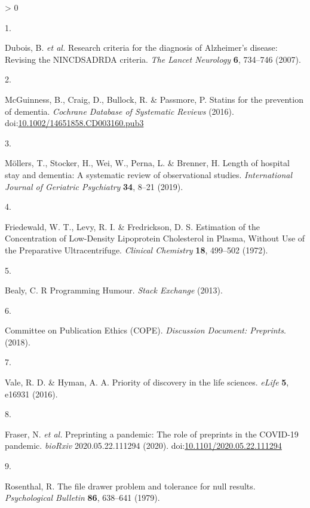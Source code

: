 \documentclass[a4paper, twoside]{templates/ociamthesis}
\newlength{\cslhangindent}
\newlength{\csllabelwidth}
\newenvironment{CSLReferences}[3] %
 {%
  \setlength{\parindent}{0pt}
  \ifodd #1 \everypar{\setlength{\hangindent}{\cslhangindent}}\ignorespaces\fi
  \ifnum #2 > 0
  \setlength{\parskip}{#2\baselineskip}
  \fi
 }%
 {}
\newcommand{\CSLLeftMargin}[1]{\parbox[t]{\maxof{\widthof{#1}}{\csllabelwidth}}{#1}}
\newcommand{\CSLRightInline}[1]{\parbox[t]{\linewidth - \csllabelwidth}{#1}}
\begin{document}
\hypertarget{refs}{}
\begin{CSLReferences}{0}{0}
\leavevmode\hypertarget{ref-dubois2007}{}%
\CSLLeftMargin{1. }
\CSLRightInline{Dubois, B. \emph{et al.} Research criteria for the diagnosis of {Alzheimer}'s disease: Revising the {NINCDS}{{ADRDA}} criteria. \emph{The Lancet Neurology} \textbf{6}, 734--746 (2007).}

\leavevmode\hypertarget{ref-mcguinness2016b}{}%
\CSLLeftMargin{2. }
\CSLRightInline{McGuinness, B., Craig, D., Bullock, R. \& Passmore, P. Statins for the prevention of dementia. \emph{Cochrane Database of Systematic Reviews} (2016). doi:\href{https://doi.org/10.1002/14651858.CD003160.pub3}{10.1002/14651858.CD003160.pub3}}

\leavevmode\hypertarget{ref-mollers2019}{}%
\CSLLeftMargin{3. }
\CSLRightInline{Möllers, T., Stocker, H., Wei, W., Perna, L. \& Brenner, H. Length of hospital stay and dementia: {A} systematic review of observational studies. \emph{International Journal of Geriatric Psychiatry} \textbf{34}, 8--21 (2019).}

\leavevmode\hypertarget{ref-friedewald1972}{}%
\CSLLeftMargin{4. }
\CSLRightInline{Friedewald, W. T., Levy, R. I. \& Fredrickson, D. S. Estimation of the {Concentration} of {Low}-{Density Lipoprotein Cholesterol} in {Plasma}, {Without Use} of the {Preparative Ultracentrifuge}. \emph{Clinical Chemistry} \textbf{18}, 499--502 (1972).}

\leavevmode\hypertarget{ref-bealy2013}{}%
\CSLLeftMargin{5. }
\CSLRightInline{Bealy, C. R {Programming Humour}. \emph{Stack Exchange} (2013).}

\leavevmode\hypertarget{ref-committeeonpublicationethicscope2018}{}%
\CSLLeftMargin{6. }
\CSLRightInline{Committee on Publication Ethics (COPE). \emph{Discussion {Document}: {Preprints}}. (2018).}

\leavevmode\hypertarget{ref-vale2016}{}%
\CSLLeftMargin{7. }
\CSLRightInline{Vale, R. D. \& Hyman, A. A. Priority of discovery in the life sciences. \emph{eLife} \textbf{5}, e16931 (2016).}

\leavevmode\hypertarget{ref-fraser2020a}{}%
\CSLLeftMargin{8. }
\CSLRightInline{Fraser, N. \emph{et al.} Preprinting a pandemic: The role of preprints in the {COVID}-19 pandemic. \emph{bioRxiv} 2020.05.22.111294 (2020). doi:\href{https://doi.org/10.1101/2020.05.22.111294}{10.1101/2020.05.22.111294}}

\leavevmode\hypertarget{ref-rosenthal1979}{}%
\CSLLeftMargin{9. }
\CSLRightInline{Rosenthal, R. The file drawer problem and tolerance for null results. \emph{Psychological Bulletin} \textbf{86}, 638--641 (1979).}


\end{CSLReferences}
\end{document}
